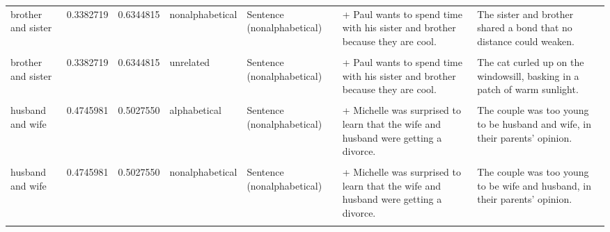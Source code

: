 \documentclass[
  12pt,
]{scrartcl}
\begin{document}
\begin{landscape}
\begin{longtable}{lrrllll}
brother and sister & 0.3382719 & 0.6344815 & nonalphabetical & Sentence (nonalphabetical) & + Paul wants to spend time with his sister and brother because they are cool. & The sister and brother shared a bond that no distance could weaken.\\
\addlinespace
\cellcolor{gray!6}{brother and sister} & \cellcolor{gray!6}{0.3382719} & \cellcolor{gray!6}{0.6344815} & \cellcolor{gray!6}{unrelated} & \cellcolor{gray!6}{Sentence (alphabetical)} & \cellcolor{gray!6}{+ Paul wants to spend time with his brother and sister because they are cool.} & \cellcolor{gray!6}{The cat curled up on the windowsill, basking in a patch of warm sunlight.}\\
brother and sister & 0.3382719 & 0.6344815 & unrelated & Sentence (nonalphabetical) & + Paul wants to spend time with his sister and brother because they are cool. & The cat curled up on the windowsill, basking in a patch of warm sunlight.\\
\cellcolor{gray!6}{husband and wife} & \cellcolor{gray!6}{0.4745981} & \cellcolor{gray!6}{0.5027550} & \cellcolor{gray!6}{alphabetical} & \cellcolor{gray!6}{Sentence (alphabetical)} & \cellcolor{gray!6}{+ Michelle was surprised to learn that the husband and wife were getting a divorce.} & \cellcolor{gray!6}{The couple was too young to be husband and wife, in their parents' opinion.}\\
husband and wife & 0.4745981 & 0.5027550 & alphabetical & Sentence (nonalphabetical) & + Michelle was surprised to learn that the wife and husband were getting a divorce. & The couple was too young to be husband and wife, in their parents' opinion.\\
\cellcolor{gray!6}{husband and wife} & \cellcolor{gray!6}{0.4745981} & \cellcolor{gray!6}{0.5027550} & \cellcolor{gray!6}{nonalphabetical} & \cellcolor{gray!6}{Sentence (alphabetical)} & \cellcolor{gray!6}{+ Michelle was surprised to learn that the husband and wife were getting a divorce.} & \cellcolor{gray!6}{The couple was too young to be wife and husband, in their parents' opinion.}\\
\addlinespace
husband and wife & 0.4745981 & 0.5027550 & nonalphabetical & Sentence (nonalphabetical) & + Michelle was surprised to learn that the wife and husband were getting a divorce. & The couple was too young to be wife and husband, in their parents' opinion.\\
\cellcolor{gray!6}{husband and wife} & \cellcolor{gray!6}{0.4745981} & \cellcolor{gray!6}{0.5027550} & \cellcolor{gray!6}{unrelated} & \cellcolor{gray!6}{Sentence (alphabetical)} & \cellcolor{gray!6}{+ Michelle was surprised to learn that the husband and wife were getting a divorce.} & \cellcolor{gray!6}{The old house creaked and groaned with every gust of wind.}\\

\end{longtable}
\end{landscape}
\end{document}
